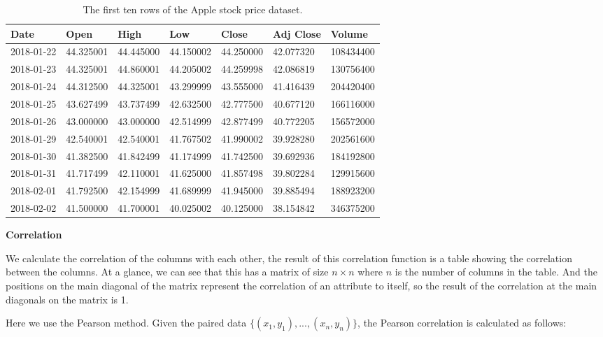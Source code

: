 \documentclass[a4paper]{article}
\begin{document}
\begin{table}[!h]
    \centering
    \caption{The first ten rows of the Apple stock price dataset.}
    \vspace{5pt}
    \begin{tabular}{|l|l|l|l|l|l|l|}
    \hline
        \textbf{Date} & \textbf{Open} & \textbf{High} & \textbf{Low} & \textbf{Close} & \textbf{Adj Close} & \textbf{Volume} \\ \hline
        2018-01-22 & 44.325001 & 44.445000 & 44.150002 & 44.250000 & 42.077320 & 108434400 \\ \hline
        2018-01-23 & 44.325001 & 44.860001 & 44.205002 & 44.259998 & 42.086819 & 130756400 \\ \hline
        2018-01-24 & 44.312500 & 44.325001 & 43.299999 & 43.555000 & 41.416439 & 204420400 \\ \hline
        2018-01-25 & 43.627499 & 43.737499 & 42.632500 & 42.777500 & 40.677120 & 166116000 \\ \hline
        2018-01-26 & 43.000000 & 43.000000 & 42.514999 & 42.877499 & 40.772205 & 156572000 \\ \hline
        2018-01-29 & 42.540001 & 42.540001 & 41.767502 & 41.990002 & 39.928280 & 202561600 \\ \hline
        2018-01-30 & 41.382500 & 41.842499 & 41.174999 & 41.742500 & 39.692936 & 184192800 \\ \hline
        2018-01-31 & 41.717499 & 42.110001 & 41.625000 & 41.857498 & 39.802284 & 129915600 \\ \hline
        2018-02-01 & 41.792500 & 42.154999 & 41.689999 & 41.945000 & 39.885494 & 188923200 \\ \hline
        2018-02-02 & 41.500000 & 41.700001 & 40.025002 & 40.125000 & 38.154842 & 346375200 \\ \hline
    \end{tabular}
\end{table}
\textbf{Correlation}

We calculate the correlation of the columns with each other, the result of this correlation function is a table showing the correlation between the columns. At a glance, we can see that this has a matrix of size $n \times n $ where $n$ is the number of columns in the table. And the positions on the main diagonal of the matrix represent the correlation of an attribute to itself, so the result of the correlation at the main diagonals on the matrix is 1.

Here we use the Pearson method. Given the paired data $\{(x_1,y_1),...,(x_{n},y_{n})\}$, the Pearson correlation is calculated as follows:
\end{document}
